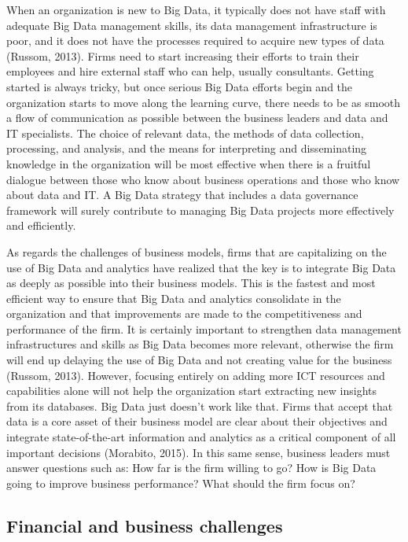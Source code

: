 \documentclass[
  letterpaper,
  DIV=11,
  numbers=noendperiod]{scrreprt}
\begin{document}
When an organization is new to Big Data, it typically does not have
staff with adequate Big Data management skills, its data management
infrastructure is poor, and it does not have the processes required to
acquire new types of data (Russom, 2013). Firms need to start increasing
their efforts to train their employees and hire external staff who can
help, usually consultants. Getting started is always tricky, but once
serious Big Data efforts begin and the organization starts to move along
the learning curve, there needs to be as smooth a flow of communication
as possible between the business leaders and data and IT specialists.
The choice of relevant data, the methods of data collection, processing,
and analysis, and the means for interpreting and disseminating knowledge
in the organization will be most effective when there is a fruitful
dialogue between those who know about business operations and those who
know about data and IT. A Big Data strategy that includes a data
governance framework will surely contribute to managing Big Data
projects more effectively and efficiently.

As regards the challenges of business models, firms that are
capitalizing on the use of Big Data and analytics have realized that the
key is to integrate Big Data as deeply as possible into their business
models. This is the fastest and most efficient way to ensure that Big
Data and analytics consolidate in the organization and that improvements
are made to the competitiveness and performance of the firm. It is
certainly important to strengthen data management infrastructures and
skills as Big Data becomes more relevant, otherwise the firm will end up
delaying the use of Big Data and not creating value for the business
(Russom, 2013). However, focusing entirely on adding more ICT resources
and capabilities alone will not help the organization start extracting
new insights from its databases. Big Data just doesn't work like that.
Firms that accept that data is a core asset of their business model are
clear about their objectives and integrate state-of-the-art information
and analytics as a critical component of all important decisions
(Morabito, 2015). In this same sense, business leaders must answer
questions such as: How far is the firm willing to go? How is Big Data
going to improve business performance? What should the firm focus on?

\hypertarget{financial-and-business-challenges}{%
\subsection{Financial and business
challenges}\label{financial-and-business-challenges}}
\end{document}
